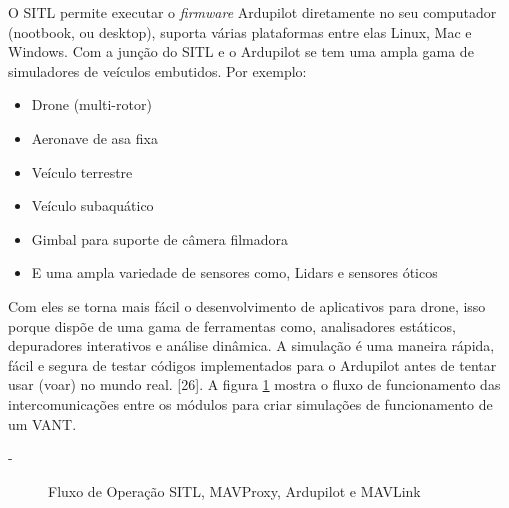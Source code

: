 O SITL permite executar o \textit{firmware} Ardupilot diretamente no seu computador (nootbook, ou desktop), suporta várias plataformas entre elas Linux, Mac e Windows.
Com a junção do SITL e o Ardupilot se tem uma ampla gama de simuladores de veículos embutidos. Por exemplo:
\begin{itemize}
    \item Drone (multi-rotor)
    \item Aeronave de asa fixa
    \item Veículo terrestre
    \item Veículo subaquático
    \item Gimbal para suporte de câmera filmadora
    \item E uma ampla variedade de sensores como, Lidars e sensores óticos
\end{itemize}

Com eles se torna mais fácil o desenvolvimento de aplicativos para drone, isso porque dispõe de uma gama de ferramentas como, analisadores estáticos, depuradores interativos e análise dinâmica. A simulação é uma maneira rápida, fácil e segura de testar códigos implementados para o Ardupilot antes de tentar usar (voar) no mundo real. [26]. A figura \ref{fig:ardupilot} mostra o fluxo de funcionamento das intercomunicações entre os módulos para criar simulações de funcionamento de um VANT.

-
\begin{figure}[H]
	\centering
	\caption{Fluxo de Operação SITL, MAVProxy, Ardupilot e MAVLink}
	\fontsize{9pt}{12pt}\selectfont
	\color{white}
	\def\svgwidth{15cm}
	
	\label{fig:ardupilot}
\end{figure}

